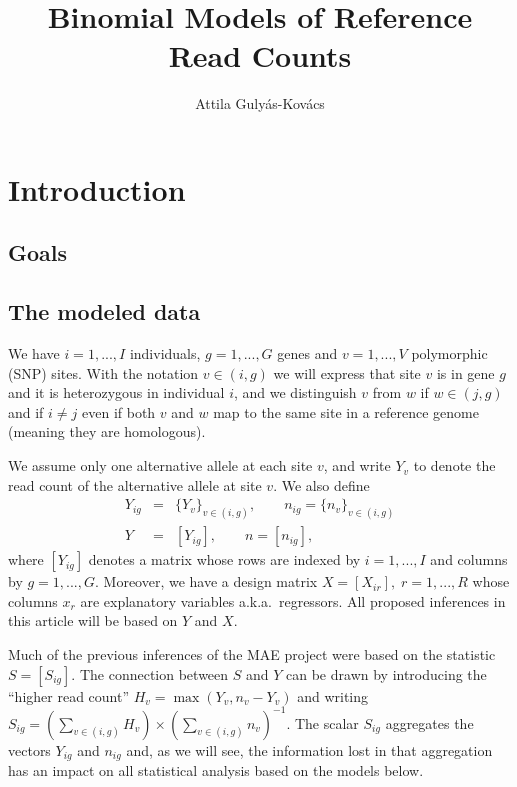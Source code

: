 \documentclass[letterpaper]{article}
\title{Binomial Models of Reference Read Counts}
\author{Attila Gulyás-Kovács}
\begin{document}
\maketitle

\section{Introduction}

\subsection{Goals}

\subsection{The modeled data}

We have \(i=1,...,I\) individuals, \(g=1,...,G\) genes and \(v=1,...,V\)
polymorphic (SNP) sites.  With the notation \(v\in(i,g)\) we will express that site \(v\) is in
gene \(g\) and it is heterozygous in individual \(i\), and we distinguish \(v\)
from \(w\) if \(w\in(j,g)\) and if \(i\neq j\) even if both \(v\) and \(w\) map to
the same site in a reference genome (meaning they are homologous).

We assume only one alternative allele at each site \(v\), and write \(Y_v\) to
denote the read count of the alternative allele at site \(v\).  We also define 
\begin{eqnarray}
\label{eq:Y-ig-def}
Y_{ig} &=&  \{Y_v\}_{v\in(i,g)}, \qquad n_{ig} = \{n_v\}_{v\in(i,g)} \\
\label{eq:Y-def}
Y &=&  [Y_{ig}], \qquad n = [n_{ig}],
\end{eqnarray}
where \([Y_{ig}]\) denotes a matrix whose rows are indexed by \(i=1,...,I\)
and columns by \(g=1,...,G\).  Moreover, we have a design matrix \(X =
[X_{ir}], \; r=1,...,R\) whose columns \(x_r\) are explanatory variables
a.k.a.~regressors.  All
proposed inferences in this article will be based on \(Y\) and \(X\).

Much of the previous inferences of the MAE project were based on the statistic
\(S = [S_{ig}]\). The connection between \(S\) and \(Y\) can be drawn by
introducing the ``higher read count'' \(H_{v} = \max(Y_v, n_v-Y_v)\) and
writing \(S_{ig} = \left( \sum_{v\in(i,g)} H_v \right) \times \left(
\sum_{v\in(i,g)} n_v \right)^{-1}\).  The scalar \(S_{ig}\) aggregates the
vectors \(Y_{ig}\) and \(n_{ig}\) and, as we will see, the information lost in
that aggregation has an impact on all statistical analysis based on the models
below.
\end{document}
